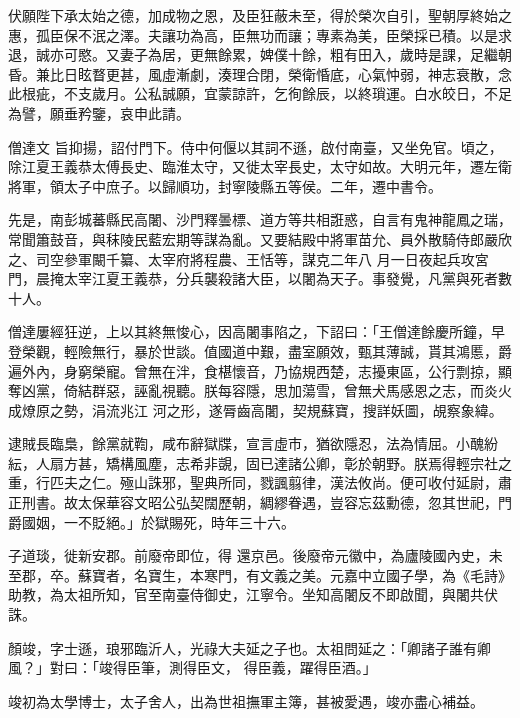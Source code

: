 \begin{pinyinscope}
 伏願陛下承太始之德，加成物之恩，及臣狂蔽未至，得於榮次自引，聖朝厚終始之惠，孤臣保不泯之澤。夫讓功為高，臣無功而讓；專素為美，臣榮採已積。以是求退，誠亦可愍。又妻子為居，更無餘累，婢僕十餘，粗有田入，歲時是課，足繼朝昏。兼比日眩瞀更甚，風虛漸劇，湊理合閉，榮衛惛底，心氣忡弱，神志衰散，念此根疵，不支歲月。公私誠願，宜蒙諒許，乞徇餘辰，以終瑣運。白水皎日，不足為譬，願垂矜鑒，哀申此請。



 僧達文
 旨抑揚，詔付門下。侍中何偃以其詞不遜，啟付南臺，又坐免官。頃之，除江夏王義恭太傅長史、臨淮太守，又徙太宰長史，太守如故。大明元年，遷左衛將軍，領太子中庶子。以歸順功，封寧陵縣五等侯。二年，遷中書令。



 先是，南彭城蕃縣民高闍、沙門釋曇標、道方等共相誑惑，自言有鬼神龍鳳之瑞，常聞簫鼓音，與秣陵民藍宏期等謀為亂。又要結殿中將軍苗允、員外散騎侍郎嚴欣之、司空參軍闞千纂、太宰府將程農、王恬等，謀克二年八
 月一日夜起兵攻宮門，晨掩太宰江夏王義恭，分兵襲殺諸大臣，以闍為天子。事發覺，凡黨與死者數十人。



 僧達屢經狂逆，上以其終無悛心，因高闍事陷之，下詔曰：「王僧達餘慶所鐘，早登榮觀，輕險無行，暴於世談。值國道中艱，盡室願效，甄其薄誠，貰其鴻慝，爵遍外內，身窮榮寵。曾無在泮，食椹懷音，乃協規西楚，志擾東區，公行剽掠，顯奪凶黨，倚結群惡，誣亂視聽。朕每容隱，思加蕩雪，曾無犬馬感恩之志，而炎火成燎原之勢，涓流兆江
 河之形，遂脣齒高闍，契規蘇寶，搜詳妖圖，覘察象緯。



 逮賊長臨梟，餘黨就鞫，咸布辭獄牒，宣言虛市，猶欲隱忍，法為情屈。小醜紛紜，人扇方甚，矯構風塵，志希非覬，固已達諸公卿，彰於朝野。朕焉得輕宗社之重，行匹夫之仁。殛山誅邪，聖典所同，戮諷翦律，漢法攸尚。便可收付延尉，肅正刑書。故太保華容文昭公弘契闊歷朝，綢繆眷遇，豈容忘茲勳德，忽其世祀，門爵國姻，一不貶絕。」於獄賜死，時年三十六。



 子道琰，徙新安郡。前廢帝即位，得
 還京邑。後廢帝元徽中，為廬陵國內史，未至郡，卒。蘇寶者，名寶生，本寒門，有文義之美。元嘉中立國子學，為《毛詩》助教，為太祖所知，官至南臺侍御史，江寧令。坐知高闍反不即啟聞，與闍共伏誅。


顏竣，字士遜，琅邪臨沂人，光祿大夫延之子也。太祖問延之：「卿諸子誰有卿風？」對曰：「竣得臣筆，測得臣文，
 得臣義，躍得臣酒。」



 竣初為太學博士，太子舍人，出為世祖撫軍主簿，甚被愛遇，竣亦盡心補益。




\end{pinyinscope}
